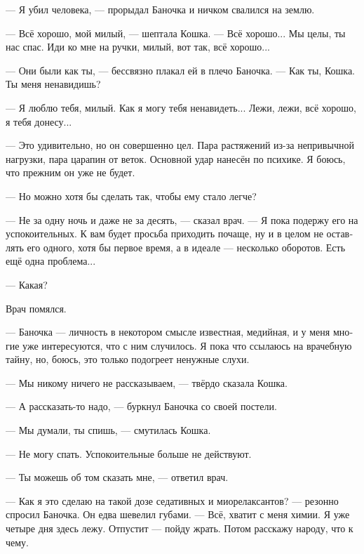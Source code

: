\documentclass[a4paper,12pt,fleqn]{book}\usepackage{polyglossia}\setdefaultlanguage[babelshorthands=true]{russian}\setotherlanguage{english}\defaultfontfeatures{Ligatures=TeX,Mapping=tex-text}\usepackage{xcolor}\newcommand{\ml}[3]{#2}
\newcommand{\asterism}{\vspace{1em}{\centering\Large\bfseries$\ast~\ast~\ast$\par}\vspace{1em}}
\begin{document}
{--- Я убил человека, --- прорыдал Баночка и ничком свалился на землю.

--- Всё хорошо, мой милый, --- шептала Кошка.
--- Всё хорошо...
Мы целы, ты нас спас.
Иди ко мне на ручки, милый, вот так, всё хорошо...

--- Они были как ты, --- бессвязно плакал ей в плечо Баночка.
--- Как ты, Кошка.
Ты меня ненавидишь?

--- Я люблю тебя, милый.
Как я могу тебя ненавидеть...
Лежи, лежи, всё хорошо, я тебя донесу...

\asterism

--- Это удивительно, но он совершенно цел.
Пара растяжений из-за непривычной нагрузки, пара царапин от веток.
Основной удар нанесён по психике.
\ml{$0$}
{Я боюсь, что прежним он уже не будет.}
{I'm afraid he won't be the same anymore.''}

--- Но можно хотя бы сделать так, чтобы ему стало легче?

\ml{$0$}
{--- Не за одну ночь и даже не за десять, --- сказал врач.}
{``Not in one night, not even in ten,'' the doctor said.}
--- Я пока подержу его на успокоительных.
К вам будет просьба приходить почаще, ну и в целом не оставлять его одного, хотя бы первое время, а в идеале --- несколько оборотов.
\ml{$0$}
{Есть ещё одна проблема...}
{There's one more problem ....''}

\ml{$0$}
{--- Какая?}
{``What?''}

Врач помялся.

--- Баночка --- личность в некотором смысле известная, медийная, и у меня многие уже интересуются, что с ним случилось.
Я пока что ссылаюсь на врачебную тайну, но, боюсь, это только подогреет ненужные слухи.

\ml{$0$}
{--- Мы никому ничего не рассказываем, --- твёрдо сказала Кошка.}
{``We won't tell anyone anything,'' Cat firmly said.}

\ml{$0$}
{--- А рассказать-то надо, --- буркнул Баночка со своей постели.}
{``But it has to be told,'' Flask grumped from his bed.}

--- Мы думали, ты спишь, --- смутилась Кошка.

--- Не могу спать.
Успокоительные больше не действуют.

--- Ты можешь об том сказать мне, --- ответил врач.

--- Как я это сделаю на такой дозе седативных и миорелаксантов? --- резонно спросил Баночка.
Он едва шевелил губами.
--- Всё, хватит с меня химии.
Я уже четыре дня здесь лежу.
Отпустит --- пойду жрать.
Потом расскажу народу, что к чему.

}
\end{document}
